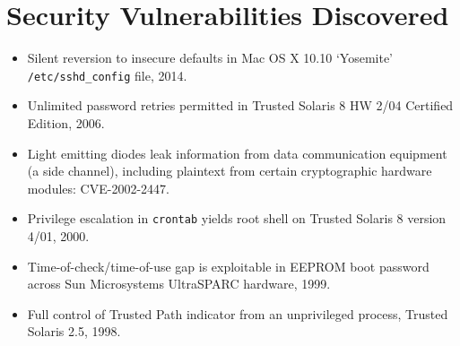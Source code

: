 \vspace{2mm}
\section*{Security Vulnerabilities Discovered}

\vspace{-2mm}
\begin{itemize}
    \item Silent reversion to insecure defaults in Mac OS X 10.10 `Yosemite'
        \texttt{/etc/sshd\_config} file, 2014.\vspace{-2mm}
	\item Unlimited password retries permitted in Trusted Solaris 8 HW 2/04
		Certified Edition, 2006.\vspace{-2mm}
	\item Light emitting diodes leak information from data
        communication equipment (a side channel), including plaintext from
		certain cryptographic hardware modules: CVE-2002-2447.\vspace{-2mm}
	\item Privilege escalation in \verb,crontab, yields root shell on Trusted
		Solaris 8 version 4/01, 2000.\vspace{-2mm}
    \item Time-of-check/time-of-use gap is exploitable in EEPROM boot
        password across Sun Microsystems UltraSPARC hardware, 1999.\vspace{-2mm}
    \item Full control of Trusted Path indicator from an unprivileged process,
        Trusted Solaris 2.5, 1998.\vspace{-2mm}
\end{itemize}

